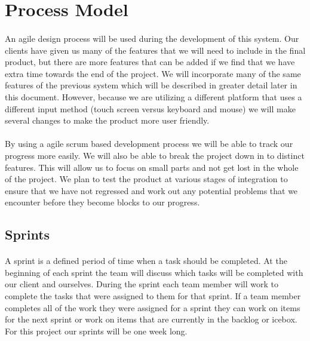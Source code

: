 \section{Process Model}
\paragraph{} An agile design process will be used during the development of this system. Our clients have given us many of the features that we will need to include in the final product, but there are more features that can be added if we find that we have extra time towards the end of the project. We will incorporate many of the same features of the previous system which will be described in greater detail later in this document. However, because we are utilizing a different platform that uses a different input method (touch screen versus keyboard and mouse) we will make several changes to make the product more user friendly.

\paragraph{} By using a agile scrum based development process we will be able to track our progress more easily. We will also be able to break the project down in to distinct features. This will allow us to focus on small parts and not get lost in the whole of the project. We plan to test the product at various stages of integration to ensure that we have not regressed and work out any potential problems that we encounter before they become blocks to our progress.

\subsection{Sprints}
\paragraph{} A sprint is a defined period of time when a task should be completed. At the beginning of each sprint the team will discuss which tasks will be completed with our client and ourselves. During the sprint each team member will work to complete the tasks that were assigned to them for that sprint. If a team member completes all of the work they were assigned for a sprint they can work on items for the next sprint or work on items that are currently in the backlog or icebox. For this project our sprints will be one week long.